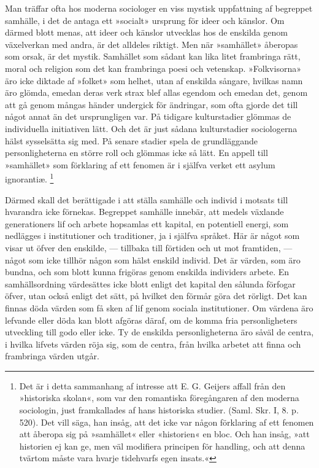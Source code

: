 \documentclass[12pt]{article}
\newcommand{\opage}[1]{\marginnote{\footnotesize\textit{[#1]}}}
\begin{document}
Man träffar ofta hos moderna sociologer en viss mystisk uppfattning af begreppet samhälle, i det de antaga ett »socialt» ursprung för ideer och känslor. Om därmed blott menas, att ideer och känslor utvecklas hos de enskilda genom växelverkan med andra, är det alldeles riktigt. Men när »samhället» åberopas som orsak, är det mystik. Samhället som sådant kan lika litet frambringa rätt, moral och religion som det kan frambringa poesi och vetenskap. »Folkvisorna» äro icke diktade af »folket» som helhet, utan af enskilda sångare, hvilkas namn äro glömda, emedan deras verk strax blef allas egendom och emedan det, genom att gå genom mångas händer undergick för%
\opage{47}
ändringar, som ofta gjorde det till något annat än det ursprungligen var. På tidigare kulturstadier glömmas de individuella initiativen lätt. Och det är just sådana kulturstadier sociologerna hälst sysselsätta sig med. På senare stadier spela de grundläggande personligheterna en större roll och glömmas icke så lätt. En appell till »samhället» som förklaring af ett fenomen är i själfva verket ett asylum ignorantiæ. %
\footnote[1]{Det är i detta sammanhang af intresse att E. G. Geijers affall från den »historiska skolan«, som var den romantiska föregångaren af den moderna sociologin, just framkallades af hans historiska studier. (Saml. Skr. I, 8. p. 520). Det vill säga, han insåg, att det icke var någon förklaring af ett fenomen att åberopa sig på »samhället« eller «historien« %
en bloc. Och han insåg, »att historien ej kan ge, men väl modifiera principen för handling, och att denna tvärtom måste vara hvarje tidehvarfs egen insats.«}

Därmed skall det berättigade i att ställa samhälle och individ i motsats till hvarandra icke förnekas. Begreppet samhälle innebär, att medels växlande generationers lif och arbete hopsamlas ett kapital, en potentiell energi, som nedlägges i institutioner och traditioner, ja i själfva språket. Här är något som visar ut öfver den enskilde, --- tillbaka till %
\opage{48}
förtiden och ut mot framtiden, --- något som icke tillhör någon som hälst enskild individ. Det är värden, som äro bundna, och som blott kunna frigöras genom enskilda individers arbete. En samhällsordning värdesättes icke blott enligt det kapital den sålunda förfogar öfver, utan också enligt det sätt, på hvilket den förmår göra det rörligt. Det kan finnas döda värden som få sken af lif genom sociala institutioner. Om värdena äro lefvande eller döda kan blott afgöras däraf, om de komma fria personligheters utveckling till godo eller icke. Ty de enskilda personligheterna äro såväl de centra, i hvilka lifvets värden röja sig, som de centra, från hvilka arbetet att finna och frambringa värden utgår.
\end{document}

